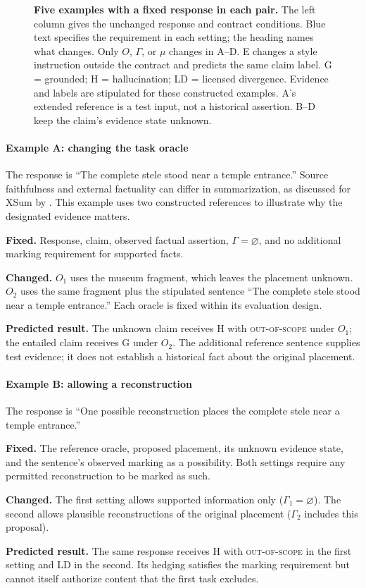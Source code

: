 \documentclass{clv2025}
\newcommand{\LD}{\textsc{LD}}
\newcommand{\Hall}{\textsc{H}}
\newcommand{\Grd}{\textsc{G}}
\begin{document}
\begin{figure}[!ht]
\centering

\caption{\textbf{Five examples with a fixed response in each pair.}
The left column gives the unchanged response and contract conditions.
Blue text specifies the requirement in each setting; the heading names
what changes. Only $O$, $\Gamma$, or $\mu$ changes in A--D. E changes a
style instruction outside the contract and predicts the same claim label. G = grounded; H = hallucination;
LD = licensed divergence. Evidence and labels are stipulated for these
constructed examples. A's extended reference is a test input, not a
historical assertion. B--D keep the claim's evidence state unknown.}
\label{fig:example-transitions}
\end{figure}
\FloatBarrier

\paragraph{Example A: changing the task oracle}
The response is ``The complete stele stood near a temple entrance.''
Source faithfulness and external factuality can differ in summarization,
as discussed for XSum by \citet{maynez_faithfulness_2020}. This example uses
two constructed references to illustrate why the designated evidence matters.
\par\textbf{Fixed.} Response, claim, observed factual assertion,
$\Gamma=\varnothing$, and no additional marking requirement for supported facts.
\par\textbf{Changed.} $O_1$ uses the museum fragment, which leaves the
placement unknown. $O_2$ uses the same fragment plus the stipulated sentence
``The complete stele stood near a temple entrance.'' Each oracle is fixed
within its evaluation design.
\par\textbf{Predicted result.} The unknown claim receives \Hall{} with
\textsc{out-of-scope} under $O_1$; the entailed claim receives \Grd{} under
$O_2$. The additional reference sentence supplies test evidence; it does
not establish a historical fact about the original placement.

\paragraph{Example B: allowing a reconstruction}
The response is ``One possible reconstruction places the complete stele
near a temple entrance.''
\par\textbf{Fixed.} The reference oracle, proposed placement, its unknown
evidence state, and the sentence's observed marking as a possibility.
Both settings require any permitted reconstruction to be marked as such.
\par\textbf{Changed.} The first setting allows supported information only
($\Gamma_1=\varnothing$). The second allows plausible reconstructions of the
original placement ($\Gamma_2$ includes this proposal).
\par\textbf{Predicted result.} The same response receives \Hall{} with
\textsc{out-of-scope} in the first setting and \LD{} in the second.
Its hedging satisfies the marking requirement but cannot itself authorize
content that the first task excludes.
\end{document}
